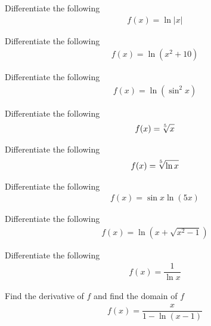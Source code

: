 \begin{exercise}
Differentiate the following
\begin{align*}
    f(x) = \ln \lvert x \rvert
\end{align*}
\end{exercise}

\begin{exercise}
Differentiate the following
\begin{align*}
    f(x) = \ln(x^2 + 10)
\end{align*}
\end{exercise}

\begin{exercise}
Differentiate the following
\begin{align*}
    f(x) = \ln (\sin^{2} x)
\end{align*}
\end{exercise}

\begin{exercise}
Differentiate the following
\begin{align*}
    f(x) = \sqrt[\leftroot{2}\uproot{2}5]{x}
\end{align*}
\end{exercise}

\begin{exercise}
Differentiate the following
\begin{align*}
    f(x) = \sqrt[\leftroot{2}\uproot{2}5]{\ln x}
\end{align*}
\end{exercise}

\begin{exercise}
Differentiate the following
\begin{align*}
    f(x) = \sin x \ln (5x)
\end{align*}
\end{exercise}

\begin{exercise}
Differentiate the following
\begin{align*}
    f(x) = \ln (x + \sqrt{x^2 - 1})
\end{align*}
\end{exercise}

\begin{exercise}
Differentiate the following
\begin{align*}
    f(x) = \dfrac{1}{\ln x}
\end{align*}
\end{exercise}

\begin{exercise}
Find the derivative of $f$ and find the domain of $f$
\begin{align*}
    f(x) = \dfrac{x}{1 - \ln(x-1)}
\end{align*}
\end{exercise}

